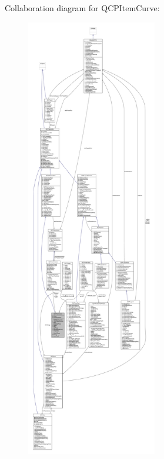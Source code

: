 Collaboration diagram for Q\+C\+P\+Item\+Curve\+:\nopagebreak
\begin{figure}[H]
\begin{center}
\leavevmode
\includegraphics[height=550pt]{class_q_c_p_item_curve__coll__graph}
\end{center}
\end{figure}
